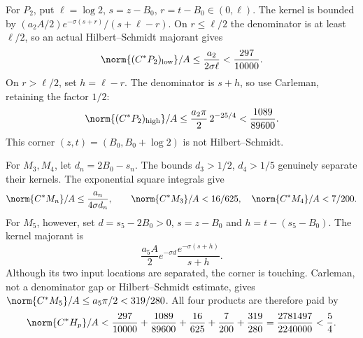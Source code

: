 \documentclass[11pt,a4paper]{article}
\numberwithin{equation}{section}
\theoremstyle{definition}\newtheorem{definition}[theorem]{Definition}
\theoremstyle{remark}\newtheorem{remark}[theorem]{Remark}
\begin{document}
For $P_2$, put $\ell=\log2$, $s=z-{B_0}$, $r=t-{B_0}\in(0,\ell)$.
The kernel is bounded by
$(a_2A/2)e^{-\sigma(s+r)}/(s+\ell-r)$.
On $r\le\ell/2$ the denominator is at least $\ell/2$, so an actual Hilbert--Schmidt majorant gives
\[
 \norm{(C^*P_2)_{\rm low}}/A
 \le\frac{a_2}{2\sigma\ell}<\frac{297}{10000}.
\]
On $r>\ell/2$, set $h=\ell-r$. The denominator is $s+h$, so use Carleman, retaining the factor $1/2$:
\[
 \norm{(C^*P_2)_{\rm high}}/A
 \le\frac{a_2\pi}{2}\,2^{-25/4}<\frac{1089}{89600}.
\]
This corner $(z,t)=({B_0},{B_0}+\log2)$ is not Hilbert--Schmidt.

For $M_3,M_4$, let $d_n=2{B_0}-s_n$. The bounds
$d_3>1/2$, $d_4>1/5$ genuinely separate their kernels.
The exponential square integrals give
\[
 \norm{C^*M_n}/A\le\frac{a_n}{4\sigma d_n},\qquad
 \norm{C^*M_3}/A<16/625,\quad \norm{C^*M_4}/A<7/200.
\]
For $M_5$, however, set $d=s_5-2{B_0}>0$,
$s=z-{B_0}$ and $h=t-(s_5-{B_0})$.
The kernel majorant is
\[
 \frac{a_5A}{2}e^{-\sigma d}\frac{e^{-\sigma(s+h)}}{s+h}.
\]
Although its two input locations are separated, the corner is touching.
Carleman, not a denominator gap or Hilbert--Schmidt estimate, gives
$\norm{C^*M_5}/A\le a_5\pi/2<319/280$.
All four products are therefore paid by
\begin{equation}\label{c:eq:CHp}
 \norm{C^*H_p}/A<
 \frac{297}{10000}+\frac{1089}{89600}+\frac{16}{625}
 +\frac7{200}+\frac{319}{280}
 =\frac{2781497}{2240000}<\frac54.
\end{equation}
\end{document}
